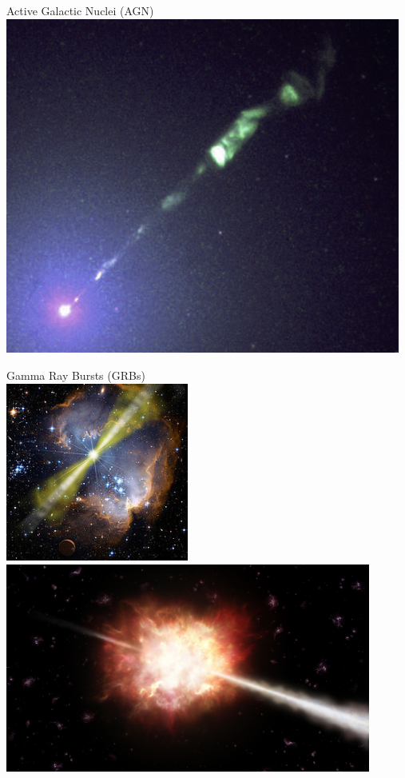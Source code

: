 \twocolumn
\begin{center}
{\blue Active Galactic Nuclei (AGN)}\\[1cm]
\includegraphics[keepaspectratio,width=13cm]{M87jet}
\end{center}

\newpage

\begin{center}
{\blue Gamma Ray Bursts (GRBs)}\\[1cm]
\includegraphics[keepaspectratio,width=6cm]{grb}\\[3mm]
\includegraphics[keepaspectratio,width=12cm]{grb2}
\end{center}

